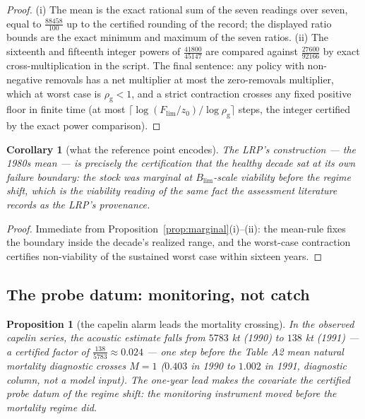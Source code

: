 \documentclass[10pt,twocolumn]{article}
\theoremstyle{plain}
\newtheorem{proposition}[theorem]{Proposition}
\newtheorem{corollary}[theorem]{Corollary}
\theoremstyle{remark}
\begin{document}
\begin{proof}
(i) The mean is the exact rational sum of the seven readings over
seven, equal to \(\tfrac{88458}{100}\) up to the certified rounding of
the record; the displayed ratio bounds are the exact minimum and
maximum of the seven ratios. (ii) The sixteenth and fifteenth integer
powers of \(\tfrac{41800}{45147}\) are compared against
\(\tfrac{27600}{92166}\) by exact cross-multiplication in the script.
The final sentence: any policy with non-negative removals has a net
multiplier at most the zero-removals multiplier, which at worst case is
\(\rho_{\mathrm{g}} < 1\), and a strict contraction crosses any fixed
positive floor in finite time (at most
\(\lceil \log(F_{\mathrm{lim}}/z_{0}) / \log \rho_{\mathrm{g}} \rceil\)
steps, the integer certified by the exact power comparison).
\end{proof}

\begin{corollary}[what the reference point encodes]\label{cor:lrp}
The LRP's construction --- the 1980s mean --- is precisely the
certification that the healthy decade sat at its own failure boundary:
the stock was marginal at \(B_{\mathrm{lim}}\)-scale viability before
the regime shift, which is the viability reading of the same fact the
assessment literature records as the LRP's provenance.
\end{corollary}

\begin{proof}
Immediate from Proposition~\ref{prop:marginal}(i)--(ii): the mean-rule
fixes the boundary inside the decade's realized range, and the
worst-case contraction certifies non-viability of the sustained
worst case within sixteen years.
\end{proof}

\subsection{The probe datum: monitoring, not catch}\label{probe}

\begin{proposition}[the capelin alarm leads the mortality
crossing]\label{prop:capelin}
In the observed capelin series, the acoustic estimate falls from
\(5783\) kt (1990) to \(138\) kt (1991) --- a certified factor of
\(\tfrac{138}{5783} \approx 0.024\) --- one step before the Table A2
mean natural mortality diagnostic crosses \(M = 1\) (\(0.403\) in
1990 to \(1.002\) in 1991, diagnostic column, not a model input). The
one-year lead makes the covariate the certified probe datum of the
regime shift: the monitoring instrument moved before the mortality
regime did.
\end{proposition}
\end{document}
